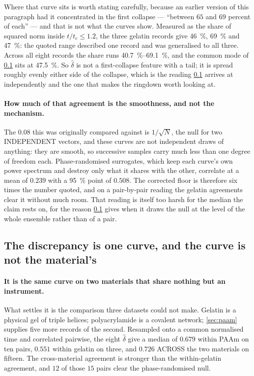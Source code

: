 \documentclass[10pt]{article}
\begin{document}
Where that curve sits is worth stating carefully, because an earlier version of this paragraph
had it concentrated in the first collapse --- ``between $65$ and $69$ percent of each'' --- and
that is not what the curves show. Measured as the share of squared norm inside $t/t_c \le 1.2$,
the three gelatin records give \SI{46}{\percent}, \SI{69}{\percent} and \SI{47}{\percent}: the
quoted range described one record and was generalised to all three. Across all eight records the
share runs \SIrange{40.7}{69.1}{\percent}, and the common mode of \cref{sec:universal} sits at
\SI{47.5}{\percent}. So $\hat\delta$ is not a first-collapse feature with a tail; it is spread
roughly evenly either side of the collapse, which is the reading \cref{sec:universal} arrives at
independently and the one that makes the ringdown worth looking at.

\paragraph{How much of that agreement is the smoothness, and not the mechanism.} The $0.08$
this was originally compared against is $1/\sqrt{N}$, the null for two INDEPENDENT vectors, and
these curves are not independent draws of anything: they are smooth, so successive samples carry
much less than one degree of freedom each. Phase-randomised surrogates, which keep each curve's
own power spectrum and destroy only what it shares with the other, correlate at a mean of
$0.239$ with a \SI{95}{\percent} point of $0.508$. The corrected floor is therefore six times the
number quoted, and on a pair-by-pair reading the gelatin agreements clear it without much room.
That reading is itself too harsh for the median the claim rests on, for the reason
\cref{sec:universal} gives when it draws the null at the level of the whole ensemble rather than
of a pair.

\subsection{The discrepancy is one curve, and the curve is not the material's}
\label{sec:universal}

\paragraph{It is the same curve on two materials that share nothing but an instrument.} What
settles it is the comparison three datasets could not make. Gelatin is a physical gel of triple
helices; polyacrylamide is a covalent network; \cref{sec:paam} supplies five more records of the
second. Resampled onto a common normalised time and correlated pairwise, the eight $\hat\delta$
give a median of $0.679$ within PAAm on ten pairs, $0.551$ within gelatin on three, and
$\mathbf{0.726}$ ACROSS the two materials on fifteen. The cross-material agreement is stronger
than the within-gelatin agreement, and $12$ of those $15$ pairs clear the phase-randomised
null.
\end{document}
